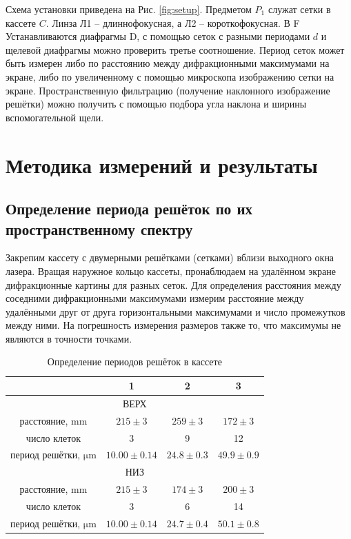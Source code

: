 \documentclass[12pt, a4paper]{article}
\begin{document}
Схема установки приведена на Рис. \ref{fig:setup}. Предметом $P_{1}$ служат
сетки в кассете $C$. Линза Л1 -- длиннофокусная, а Л2 -- короткофокусная. В F
Устанавливаются диафрагмы D, с помощью сеток с разными периодами $d$ и щелевой
диафрагмы можно проверить третье соотношение. Период сеток может быть измерен
либо по расстоянию между дифракционными максимумами на экране, либо по
увеличенному с помощью микроскопа изображению сетки на экране. Пространственную
фильтрацию (получение наклонного изображение решётки) можно получить с помощью
подбора угла наклона и ширины вспомогательной щели.

\section{Методика измерений и результаты}
\subsection{Определение периода решёток по их пространственному спектру}

Закрепим кассету с двумерными решётками (сетками) вблизи выходного окна лазера.
Вращая наружное кольцо кассеты, пронаблюдаем на удалённом экране дифракционные
картины для разных сеток. Для определения расстояния между соседними
дифракционными максимумами измерим расстояние между удалёнными друг от друга
горизонтальными максимумами и число промежутков между ними. На погрешность
измерения размеров также то, что максимумы не являются в точности точками.
\begin{table}[H]
    \centering
    \caption{Определение периодов решёток в кассете}
    \begin{tabular}{|c|c|c|c|}
        \hline
                                         & 1               & 2               & 3              \\
        \hline
        \multicolumn{4}{|c|}{ВЕРХ}                                                            \\
        \hline
        расстояние, $\mathrm{mm}$        & $215 \pm 3   $  & $259 \pm 3$     & $ 172 \pm 3$   \\
        число клеток                     & 3               & 9               & 12             \\
        период решётки, $\mathrm{\mu m}$ & $10.00\pm 0.14$ & $24.8 \pm 0.3$  & $49.9 \pm 0.9$ \\
        \hline
        \multicolumn{4}{|c|}{НИЗ}                                                             \\
        \hline
        расстояние, $\mathrm{mm}$        & $215  \pm 3$    & $174 \pm 3$     & $200 \pm 3$    \\
        число клеток                     & 3               & 6               & 14             \\
        период решётки, $\mathrm{\mu m}$ & $10.00\pm 0.14$ & $24.7 \pm 0.4 $ & $50.1 \pm 0.8$ \\
        \hline
    \end{tabular}
\end{table}
\end{document}

